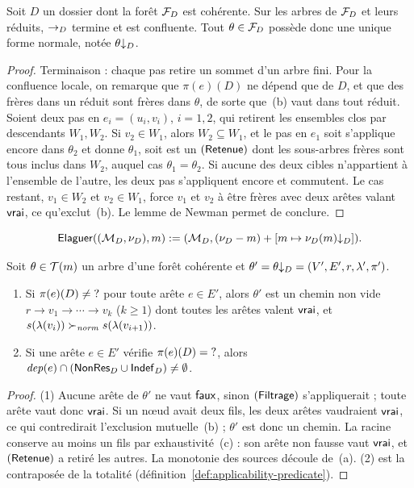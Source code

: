 \documentclass[review]{jflart}
\begin{document}
\begin{prop}\label{prop:norm}
Soit \(D\) un dossier dont la forêt \(\mathcal{F}_D\) est cohérente. Sur les arbres
de \(\mathcal{F}_D\) et leurs réduits, \(\to_{D}\) termine et est confluente. Tout
\(\theta\in\mathcal{F}_D\) possède donc une unique forme normale, notée \({\theta}{\downarrow_D}\).
\end{prop}
\begin{proof}
Terminaison : chaque pas retire un sommet d'un arbre fini. Pour la confluence
locale, on remarque que \(\pi(e)(D)\) ne dépend que de \(D\), et que des frères
dans un réduit sont frères dans \(\theta\), de sorte que~(b) vaut dans tout
réduit. Soient deux pas en \(e_i=(u_i,v_i)\), \(i=1,2\), qui retirent les
ensembles clos par descendants \(W_1,W_2\). Si \(v_2\in W_1\), alors
\(W_2\subseteq W_1\), et le pas en \(e_1\) soit s'applique encore dans
\(\theta_2\) et donne \(\theta_1\), soit est un \((\mathsf{Retenue})\) dont les
sous-arbres frères sont tous inclus dans \(W_2\), auquel cas
\(\theta_1=\theta_2\). Si aucune des deux cibles n'appartient à l'ensemble de
l'autre, les deux pas s'appliquent encore et commutent. Le cas restant,
\(v_1\in W_2\) et \(v_2\in W_1\), force \(v_1\) et \(v_2\) à être frères avec
deux arêtes valant \(\mathsf{vrai}\), ce qu'exclut~(b). Le lemme de Newman permet de
conclure.
\end{proof}

\begin{equation}
\mathsf{Elaguer}((\mathcal{M}_D,\nu_D),m):=(\mathcal{M}_D,(\nu_D-m)+[m\mapsto{\nu_D(m)}{\downarrow_D}]).
\label{eq:prune}
\end{equation}

\begin{lemm}\label{lem:linear}
Soit \(\theta\in\mathcal{T}(m)\) un arbre d'une forêt cohérente et
\(\theta'={\theta}{\downarrow_D}=(V',E',r,\lambda',\pi')\).
\begin{enumerate}
\item Si \(\pi(e)(D)\neq \mathord{?}\) pour toute arête \(e\in E'\), alors
  \(\theta'\) est un chemin non vide \(r\to v_1\to\cdots\to v_k\) (\(k\geq1\))
  dont toutes les arêtes valent \(\mathsf{vrai}\), et
  \(s(\lambda(v_i))\succ_{\mathit{norm}} s(\lambda(v_{i+1}))\).
\item Si une arête \(e\in E'\) vérifie \(\pi(e)(D)=\mathord{?}\), alors
  \(\mathit{dep}(e)\cap(\mathsf{NonRes}_D\cup\mathsf{Indef}_D)\neq\emptyset\).
\end{enumerate}
\end{lemm}
\begin{proof}
(1) Aucune arête de \(\theta'\) ne vaut \(\mathsf{faux}\), sinon \((\mathsf{Filtrage})\)
s'appliquerait ; toute arête vaut donc \(\mathsf{vrai}\). Si un nœud avait deux fils,
les deux arêtes vaudraient \(\mathsf{vrai}\), ce qui contredirait l'exclusion
mutuelle~(b) ; \(\theta'\) est donc un chemin. La racine conserve au moins un
fils par exhaustivité~(c) : son arête non fausse vaut \(\mathsf{vrai}\), et
\((\mathsf{Retenue})\) a retiré les autres. La monotonie des sources découle de~(a).
(2) est la contraposée de la totalité
(définition~\ref{def:applicability-predicate}).
\end{proof}
\end{document}
